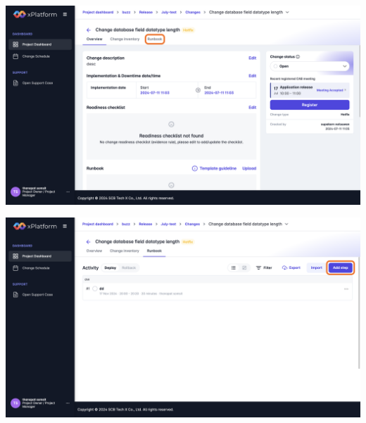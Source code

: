 \begin{center}
    \includegraphics[width=\linewidth]{resources/pages/change-runbook/create-activity/3.png}

    \vspace{1in}

    \includegraphics[width=\linewidth]{resources/pages/change-runbook/create-activity/4.png}
\end{center}


